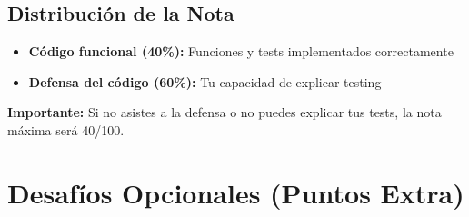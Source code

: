 \documentclass[12pt,a4paper]{article}
\begin{document}
\subsection{Distribución de la Nota}

\begin{itemize}
    \item \textbf{Código funcional (40\%):} Funciones y tests implementados correctamente
    \item \textbf{Defensa del código (60\%):} Tu capacidad de explicar testing
\end{itemize}

\textbf{Importante:} Si no asistes a la defensa o no puedes explicar tus tests, la nota máxima será 40/100.

\section{Desafíos Opcionales (Puntos Extra)}
\end{document}
